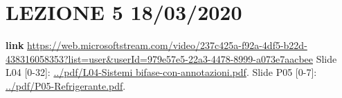 \section*{LEZIONE 5 18/03/2020}
\textbf{link} \url{https://web.microsoftstream.com/video/237c425a-f92a-4df5-b22d-438316058353?list=user&userId=979e57e5-22a3-4478-8999-a073e7aacbee}\newline
\newline
Slide L04 [0-32]: \url{../pdf/L04-Sistemi bifase-con-annotazioni.pdf}.\newline
\newline
Slide P05 [0-7]: \url{../pdf/P05-Refrigerante.pdf}.\newline
\newline